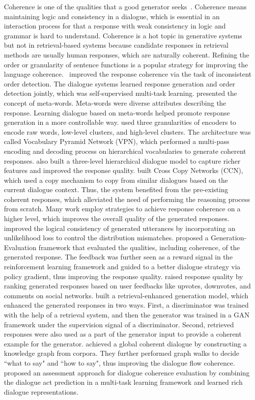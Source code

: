 \label{Response Coherence}
Coherence is one of the qualities that a good generator seeks~. Coherence means maintaining logic and consistency in a dialogue, which is essential in an interaction process for that a response with weak consistency in logic and grammar is hard to understand. Coherence is a hot topic in generative systems but not in retrieval-based systems because candidate responses in retrieval methods are usually human responses, which are naturally coherent. 
Refining the order or granularity of sentence functions is a popular strategy for improving the language coherence.~ improved the response coherence via the task of inconsistent order detection. The dialogue systems learned response generation and order detection jointly, which was self-supervised multi-task learning.  presented the concept of meta-words. Meta-words were diverse attributes describing the response. Learning dialogue based on meta-words helped promote response generation in a more controllable way.  used three granularities of encoders to encode raw words, low-level clusters, and high-level clusters. The architecture was called Vocabulary Pyramid Network (VPN), which performed a multi-pass encoding and decoding process on hierarchical vocabularies to generate coherent responses.  also built a three-level hierarchical dialogue model to capture richer features and improved the response quality.  built Cross Copy Networks (CCN), which used a copy mechanism to copy from similar dialogues based on the current dialogue context. Thus, the system benefited from the pre-existing coherent responses, which alleviated the need of performing the reasoning process from scratch. 
Many work employ strategies to achieve response coherence on a higher level, which improves the overall quality of the generated responses.  improved the logical consistency of generated utterances by incorporating an unlikelihood loss to control the distribution mismatches.  proposed a Generation-Evaluation framework that evaluated the qualities, including coherence, of the generated response. The feedback was further seen as a reward signal in the reinforcement learning framework and guided to a better dialogue strategy via policy gradient, thus improving the response quality.  raised response quality by ranking generated responses based on user feedbacks like upvotes, downvotes, and comments on social networks.  built a retrieval-enhanced generation model, which enhanced the generated responses in two ways. First, a discriminator was trained with the help of a retrieval system, and then the generator was trained in a GAN framework under the supervision signal of a discriminator. Second, retrieved responses were also used as a part of the generator input to provide a coherent example for the generator.  achieved a global coherent dialogue by constructing a knowledge graph from corpora. They further performed graph walks to decide ``what to say" and ``how to say", thus improving the dialogue flow coherence.  proposed an assessment approach for dialogue coherence evaluation by combining the dialogue act prediction in a multi-task learning framework and learned rich dialogue representations. 
